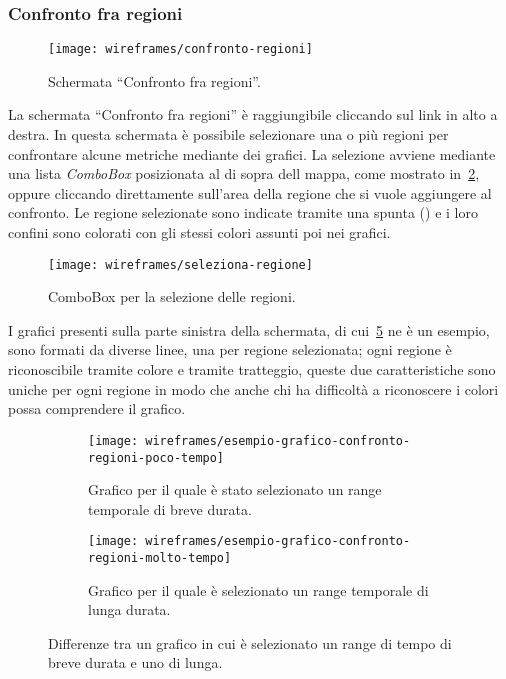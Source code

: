 \subsubsection{Confronto fra regioni}\label{ss:confronto-fra-regioni}
\begin{figure}[H]
    \centering
    \texttt{[image: wireframes/confronto-regioni]}
    \caption{Schermata ``Confronto fra regioni''.}\label{fig:confronto-regioni}
\end{figure}
La schermata ``Confronto fra regioni'' è raggiungibile cliccando sul link in alto a destra. In questa schermata è possibile selezionare una o più regioni per confrontare alcune metriche mediante dei grafici. La selezione avviene mediante una lista \textit{ComboBox} posizionata al di sopra dell mappa, come mostrato in~\ref{fig:seleziona-regione}, oppure cliccando direttamente sull'area della regione che si vuole aggiungere al confronto. Le regione selezionate sono indicate tramite una spunta (\checkmark) e i loro confini sono colorati con gli stessi colori assunti poi nei grafici.

\begin{figure}[H]
    \centering
    \texttt{[image: wireframes/seleziona-regione]}
    \caption{ComboBox per la selezione delle regioni.}\label{fig:seleziona-regione}
\end{figure}

I grafici presenti sulla parte sinistra della schermata, di cui~\ref{fig:esempio-grafico-confronto-regioni} ne è un esempio, sono formati da diverse linee, una per regione selezionata; ogni regione è riconoscibile tramite colore e tramite tratteggio, queste due caratteristiche sono uniche per ogni regione in modo che anche chi ha difficoltà a riconoscere i colori possa comprendere il grafico.

\begin{figure}[H]
    \begin{subfigure}[b]{0.5\textwidth}
        \centering
        \texttt{[image: wireframes/esempio-grafico-confronto-regioni-poco-tempo]}
        \caption{Grafico per il quale è stato selezionato un range temporale di breve durata.}\label{fig:esempio-grafico-confronto-regioni-poco-tempo}
    \end{subfigure}
\hfill
    \begin{subfigure}[b]{0.5\textwidth}
        \centering
        \texttt{[image: wireframes/esempio-grafico-confronto-regioni-molto-tempo]}
        \caption{Grafico per il quale è selezionato un range temporale di lunga durata.}\label{fig:esempio-grafico-confronto-regioni-molto-tempo}
    \end{subfigure}
    \caption{Differenze tra un grafico in cui è selezionato un range di tempo di breve durata e uno di lunga.}\label{fig:esempio-grafico-confronto-regioni}
\end{figure}

